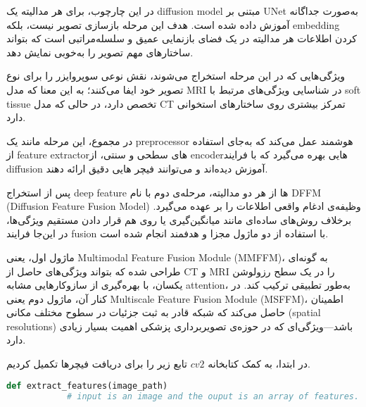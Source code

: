 \documentclass[a4paper,12pt]{article}
\begin{document}
 در این چارچوب، برای هر مدالیته یک diffusion model مبتنی بر UNet به‌صورت جداگانه آموزش داده شده است. هدف این مرحله بازسازی تصویر نیست، بلکه embedding کردن اطلاعات هر مدالیته در یک فضای بازنمایی عمیق و سلسله‌مراتبی است که بتواند ساختارهای مهم تصویر را به‌خوبی نمایش دهد.
 
 ویژگی‌هایی که در این مرحله استخراج می‌شوند، نقش نوعی سوپروایزر را برای نوع تصویر خود ایفا می‌کنند؛ به این معنا که مدل MRI در شناسایی ویژگی‌های مرتبط با soft tissue تخصص دارد، در حالی که مدل CT تمرکز بیشتری روی ساختارهای استخوانی دارد.
 
 در مجموع، این مرحله مانند یک preprocessor هوشمند عمل می‌کند که به‌جای استفاده از feature extractorهای سطحی و سنتی، از encoderهایی بهره می‌گیرد که با فرایند diffusion آموزش دیده‌اند و می‌توانند فیچر ‌هایی دقیق ارائه دهند.
 
 پس از استخراج deep feature
 ها از هر دو مدالیته، مرحله‌ی دوم با نام 
 DFFM (Diffusion Feature Fusion Model) 
 وظیفه‌ی ادغام واقعی اطلاعات را بر عهده می‌گیرد. برخلاف روش‌های ساده‌ای مانند میانگین‌گیری یا روی هم قرار دادن مستقیم ویژگی‌ها، در این‌جا فرایند fusion با استفاده از دو ماژول مجزا و هدفمند انجام شده است.
 
 ماژول اول، یعنی Multimodal Feature Fusion Module (MMFFM)، به گونه‌ای طراحی شده که بتواند ویژگی‌های حاصل از CT و MRI را در یک سطح رزولوشن یکسان، با بهره‌گیری از سازوکارهایی مشابه attention، به‌طور تطبیقی ترکیب کند. در کنار آن، ماژول دوم یعنی Multiscale Feature Fusion Module (MSFFM)، اطمینان حاصل می‌کند که شبکه قادر به ثبت جزئیات در سطوح مختلف مکانی (spatial resolutions) باشد—ویژگی‌ای که در حوزه‌ی تصویربرداری پزشکی اهمیت بسیار زیادی دارد.


	\pagebreak
	
	در ابتدا، به کمک کتابخانه 
	$cv2$
	تابع زیر را برای دریافت فیچرها تکمیل کردیم. 
	
	\begin{latin}
		\begin{lstlisting}[language=Python, caption={extract feature function}]
			def extract_features(image_path)
			# input is an image and the ouput is an array of features.
		\end{lstlisting}
	\end{latin}
	
	
\end{document}
